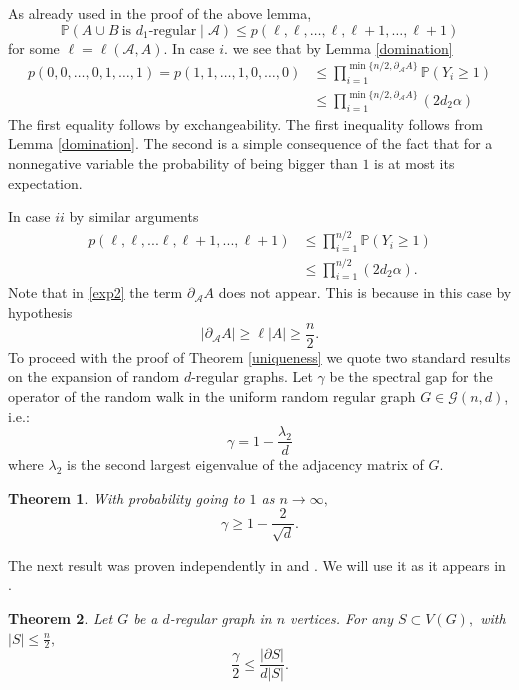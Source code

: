 \documentclass[11pt,reqno]{amsart}
\newtheorem{theorem}{Theorem}
\begin{document}
As already used in the proof of the above lemma, 
\[
\mathbb{P}(A\cup B~\mbox{is $d_1$-regular}\mid \mathcal{A})\leq p(\ell,\ell,\ldots,\ell,\ell+1,\ldots,\ell+1)\] for some $\ell=\ell(\mathcal{A},A)$. 
\noindent
In case $i.$ we see that by Lemma \ref{domination}
\begin{align}
\label{exp1}
p(0,0,\ldots,0,1,\ldots,1)=p(1,1,\ldots, 1,0,\ldots,0) & \le \prod_{i=1}^{\min \{n/2,\partial_{\mathcal{A}}A\}}\mathbb{P}(Y_i\ge 1) \\
\nonumber 
& \le  \prod_{i=1}^{\min\{n/2,\partial_{\mathcal{A}}A\}} (2 d_2\alpha)
\end{align}
The first equality follows by exchangeability. The first inequality follows from Lemma \ref{domination}. The second is a simple consequence of the fact that for a nonnegative variable the probability of being bigger than $1$ is at most its expectation.

In case $ii$ by similar arguments 
\begin{align}
\label{exp2}
p(\ell,\ell,...\ell,\ell+1,...,\ell+1)&\le \prod_{i=1}^{n/2}\mathbb{P}(Y_i\ge 1)\\
\nonumber
& \le  \prod_{i=1}^{n/2} (2 d_2\alpha).
\end{align}
Note that in \eqref{exp2} the term $\partial_{\mathcal{A}}A$ does not appear. This is because in this case by hypothesis $$|\partial_{\mathcal{A}}A|\ge \ell |A|\ge \frac{n}{2}.$$
To proceed with the proof of Theorem \ref{uniqueness} we quote two standard results on the expansion of random $d$-regular graphs.
Let $\gamma$ be the spectral gap for the operator of the random walk in the uniform random regular graph $G\in \mathcal{G}(n,d)$, i.e.:
\begin{equation}\label{gapdef}
\gamma=1-\frac{\lambda_2}{d}
\end{equation}
where $\lambda_2$ is the second largest eigenvalue of the adjacency matrix of $G$.

\begin{theorem}\cite[Theorem 1.1]{F08} With probability going to $1$ as $n \to \infty,$ $$\gamma \ge 1-\frac{2}{\sqrt{d}}.$$
\end{theorem}
The next result was proven independently in \cite{LS88} and \cite{JS89}. We will use it as it appears in \cite[Theorem 13.14]{LPW}.
\begin{theorem}\label{min_cut} Let $G$ be a $d$-regular graph in $n$ vertices. For any $S \subset V(G),$ with $|S|\le \frac{n}{2},$
$$\frac{\gamma}{2}\le \frac{|\partial S|}{d|S|}.$$
\end{theorem}
\end{document}
